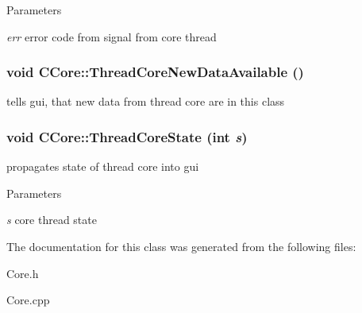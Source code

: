 \begin{DoxyParams}{Parameters}
\item[{\em err}]error code from signal from core thread \end{DoxyParams}
\hypertarget{classCCore_a05760021352ea7bdb7304d7d0f2a61eb}{
\subsubsection[{ThreadCoreNewDataAvailable}]{\setlength{\rightskip}{0pt plus 5cm}void CCore::ThreadCoreNewDataAvailable ()}}
\label{classCCore_a05760021352ea7bdb7304d7d0f2a61eb}
tells gui, that new data from thread core are in this class \hypertarget{classCCore_a6b1594d8d1a21121d0db95c5e9a8fabd}{
\subsubsection[{ThreadCoreState}]{\setlength{\rightskip}{0pt plus 5cm}void CCore::ThreadCoreState (int {\em s})}}
\label{classCCore_a6b1594d8d1a21121d0db95c5e9a8fabd}
propagates state of thread core into gui


\begin{DoxyParams}{Parameters}
\item[{\em s}]core thread state \end{DoxyParams}


The documentation for this class was generated from the following files:\begin{DoxyCompactItemize}
\item 
Core.h\item 
Core.cpp\end{DoxyCompactItemize}
